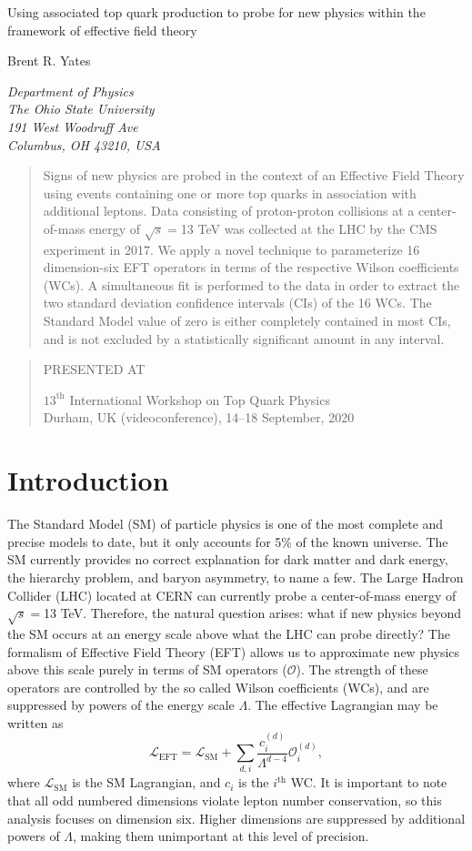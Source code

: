 \documentclass[12pt]{article}
\newcommand\pubnumber{SNSN-323-63}
\newcommand\pubdate{\today}
\def\institute{Department of Physics\\The Ohio State University\\
191 West Woodruff Ave\\
Columbus, OH 43210, USA}
\def\Title#1{\begin{center} {\Large #1 } \end{center}}
\def\Author#1{\begin{center}{ \sc #1} \end{center}}
\def\Address#1{\begin{center}{ \it #1} \end{center}}
\newcommand\pubblock{\rightline{\begin{tabular}{l} \pubnumber\\
         \pubdate  \end{tabular}}}
\newenvironment{Abstract}{\begin{quotation}  }{\end{quotation}}
\newenvironment{Presented}{\begin{quotation} \begin{center} 
             PRESENTED AT\end{center}\bigskip 
      \begin{center}\begin{large}}{\end{large}\end{center} \end{quotation}}
\begin{document}
\begin{titlepage}
\pubblock

\vfill
\Title{Using associated top quark production to probe for new physics within the framework of effective field theory}
\vfill
\Author{Brent R. Yates}
\Address{\institute}
\vfill
\begin{Abstract}
Signs of new physics are probed in the context of an Effective Field Theory using events containing one or more top quarks in association with additional leptons. Data consisting of proton-proton collisions at a center-of-mass energy of $\sqrt{s}=$13 TeV was collected at the LHC by the CMS experiment in 2017. We apply a novel technique to parameterize 16 dimension-six EFT operators in terms of the respective Wilson coefficients (WCs). A simultaneous fit is performed to the data in order to extract the two standard deviation confidence intervals (CIs) of the 16 WCs. The Standard Model value of zero is either completely contained in most CIs, and is not excluded by a statistically significant amount in any interval.
\end{Abstract}
\vfill
\begin{Presented}
$13^\mathrm{th}$ International Workshop on Top Quark Physics\\
Durham, UK (videoconference), 14--18 September, 2020
\end{Presented}
\vfill
\end{titlepage}
\def\thefootnote{\fnsymbol{footnote}}
\setcounter{footnote}{0}
%

\section{Introduction}

The Standard Model (SM) of particle physics is one of the most complete and precise models to date, but it only accounts for 5\% of the known universe. The SM currently provides no correct explanation for dark matter and dark energy, the hierarchy problem, and baryon asymmetry, to name a few. The Large Hadron Collider (LHC) located at CERN can currently probe a center-of-mass energy of $\sqrt{s}=$13 TeV. Therefore, the natural question arises: what if new physics beyond the SM occurs at an energy scale above what the LHC can probe directly? The formalism of Effective Field Theory (EFT) allows us to approximate new physics above this scale purely in terms of SM operators ($\mathcal{O}$). The strength of these operators are controlled by the so called Wilson coefficients (WCs), and are suppressed by powers of the energy scale $\Lambda$. The effective Lagrangian may be written as
\begin{equation}
	\mathcal{L}_{\mathrm{EFT}} = \mathcal{L}_{\mathrm{SM}} + \sum_{d,i} \frac{c_i^{(d)}}{\Lambda^{d-4}}\mathcal{O}_{i}^{(d)},
\end{equation}
where $\mathcal{L}_{\mathrm{SM}}$ is the SM Lagrangian, and $c_{i}$ is the $i^{\mathrm{th}}$ WC. It is important to note that all odd numbered dimensions violate lepton number conservation, so this analysis focuses on dimension six. Higher dimensions are suppressed by additional powers of $\Lambda$, making them unimportant at this level of precision.\\
\end{document}
